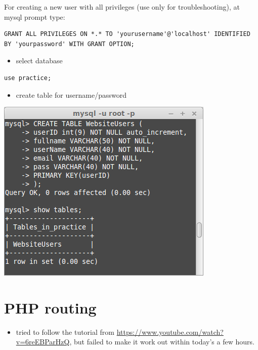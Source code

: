 \documentclass[9pt,b5paper]{article}
\begin{document}
For creating a new user with all privileges (use only for troubleshooting), at mysql prompt type:

\lstset{language=SQL,label= ,caption= ,numbers=none}
\begin{lstlisting}
GRANT ALL PRIVILEGES ON *.* TO 'yourusername'@'localhost' IDENTIFIED BY 'yourpassword' WITH GRANT OPTION;
\end{lstlisting}

\begin{itemize}
\item select database
\end{itemize}
\lstset{language=SQL,label= ,caption= ,numbers=none}
\begin{lstlisting}
use practice;
\end{lstlisting}

\begin{itemize}
\item create table for username/password
\end{itemize}
\includegraphics[width=.9\linewidth]{./pic/db.png}

\section{PHP routing}
\label{sec-2}
\begin{itemize}
\item tried to follow the tutorial from \url{https://www.youtube.com/watch?v=6reEBParHzQ}, but failed to make it work out within today's a few hours.
\end{itemize}
\end{document}
